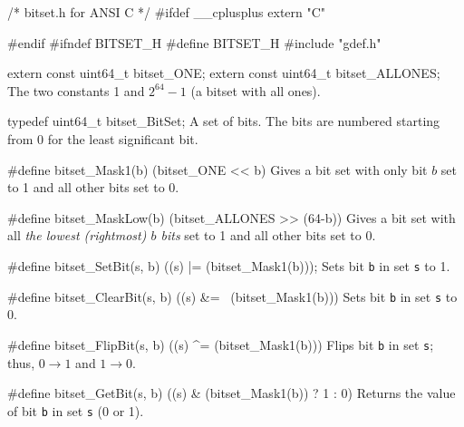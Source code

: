 \code\hide
/* bitset.h  for ANSI C */
#ifdef __cplusplus
extern "C" {
#endif
#ifndef BITSET_H
#define BITSET_H
#include "gdef.h"
\endhide\endcode


\code

extern const uint64_t bitset_ONE;
extern const uint64_t bitset_ALLONES;
\endcode
\tab
  The two constants 1 and $2^{64}-1$ (a bitset with all ones).
\endtab
\iffalse  %
\code

extern uint64_t bitset_MASK1[];
\endcode
 \tab {\tt bitset\_MASK1[j]} has only \emph{bit} $j$ set to 1 and all other
  bits set to 0.
  \pierre{Not sure if it is worthwhile to store and retrieve all these constants.
	  See \url{http://c-faq.com/misc/bitsets.html} and
    \url{https://github.com/iplinux/x11proto-trap/blob/master/xtrapbits.h}
		for alternatives.}
 \endtab
\code

extern uint64_t bitset_MASK[];
\endcode
 \tab {\tt bitset\_MASK[j]} has all \emph{the first $j$ bits} set to 1 and all other
  bits set to 0.
 \endtab
\fi  %

\code

typedef uint64_t bitset_BitSet;
\endcode
 \tab  A set of bits. The bits are numbered starting from 0 for the least significant bit.
 \endtab



\code

#define bitset_Mask1(b) (bitset_ONE << b)
\endcode
 \tab Gives a bit set with only bit $b$ set to 1 and all other bits set to 0.
 \endtab
\code

#define bitset_MaskLow(b) (bitset_ALLONES >> (64-b))
\endcode
 \tab Gives a bit set with all \emph{the lowest (rightmost) $b$ bits} set to 1
  and all other bits set to 0.
 \endtab
\code

#define bitset_SetBit(s, b) ((s) |= (bitset_Mask1(b)));
\endcode
 \tab  Sets bit {\tt b} in set  {\tt s}  to 1.
 \endtab
\code

#define bitset_ClearBit(s, b) ((s) &= ~(bitset_Mask1(b)))
\endcode
 \tab  Sets bit {\tt b} in set  {\tt s}  to 0.
 \endtab
\code

#define bitset_FlipBit(s, b) ((s) ^= (bitset_Mask1(b)))
\endcode
 \tab  Flips bit {\tt b} in set {\tt s};  thus,
        $0 \rightarrow 1$ and $1 \rightarrow 0$.
 \endtab
\code

#define bitset_GetBit(s, b)  ((s) & (bitset_Mask1(b)) ? 1 : 0)
\endcode
 \tab  Returns the value of bit {\tt b} in set {\tt s} (0 or 1).
 \endtab
\code

}
